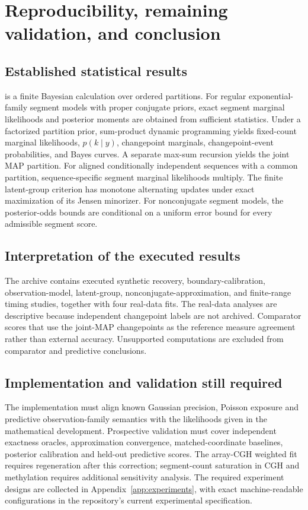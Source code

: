 \chapter{Reproducibility, remaining validation, and conclusion}
\label{ch:conclusion}\label{sec:conclusion}

\section{Established statistical results}
\BayesBreak is a finite Bayesian calculation over ordered partitions. For regular
exponential-family segment models with proper conjugate priors, exact segment marginal likelihoods
and posterior moments are obtained from sufficient statistics. Under a factorized partition prior,
sum-product dynamic programming yields fixed-count marginal likelihoods, $p(k\mid y)$,
changepoint marginals, changepoint-event probabilities, and Bayes curves. A separate max-sum
recursion yields the joint MAP partition. For aligned conditionally independent sequences with a
common partition, sequence-specific segment marginal likelihoods multiply. The finite latent-group
criterion has monotone alternating updates under exact maximization of its Jensen minorizer. For
nonconjugate segment models, the posterior-odds bounds are conditional on a uniform error bound for
every admissible segment score.

\section{Interpretation of the executed results}
The archive contains executed synthetic recovery, boundary-calibration, observation-model,
latent-group, nonconjugate-approximation, and finite-range timing studies, together with four
real-data fits. The real-data analyses are descriptive because independent changepoint labels are
not archived. Comparator scores that use the \BayesBreak joint-MAP changepoints as the reference
measure agreement rather than external accuracy. Unsupported computations are excluded from comparator and predictive conclusions.

\section{Implementation and validation still required}
The implementation must align known Gaussian precision, Poisson exposure and predictive
observation-family semantics with the likelihoods given in the mathematical development.
Prospective validation must cover independent exactness oracles, approximation convergence,
matched-coordinate baselines, posterior calibration and held-out predictive scores. The
array-CGH weighted fit requires regeneration after this correction; segment-count saturation
in CGH and methylation requires additional sensitivity analysis. The required experiment
designs are collected in Appendix~\ref{app:experiments}, with exact machine-readable
configurations in the repository's current experimental specification.

